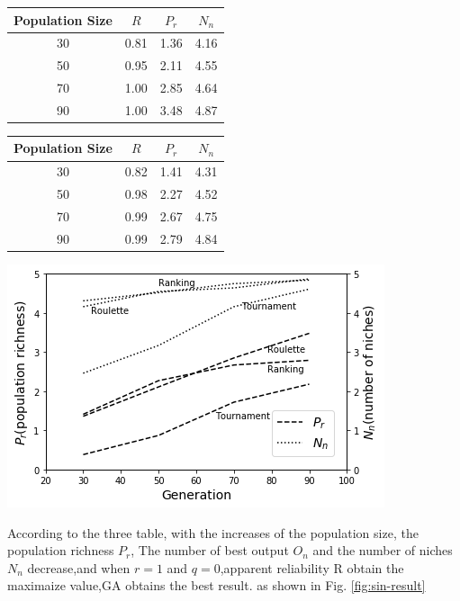 \documentclass[smallextended]{svjour3}       %
\begin{document}
\begin{multicols}{2}
\begin{center}
\begin{tabular}{cccc}
	\toprule
    Population Size& $R$   &  $P_{r}$ & $N_{n}$\\
	\midrule
    30& 0.81  &  1.36   & 4.16 \\
    50& 0.95  &  2.11   & 4.55 \\
    70& 1.00  &  2.85   & 4.64 \\
    90& 1.00  &  3.48   & 4.87 \\
	\bottomrule
\end{tabular}
\label{tab:roulette-1}
\end{center}

\begin{center}
\begin{tabular}{cccc}
	\toprule
    Population Size& $R$   &  $P_{r}$ & $N_{n}$\\
	\midrule
    30& 0.82  &  1.41   & 4.31 \\
    50& 0.98  &  2.27   & 4.52 \\
    70& 0.99  &  2.67   & 4.75 \\
    90& 0.99  &  2.79   & 4.84 \\
	\bottomrule
\end{tabular}
\label{tab:ranking-1}
\end{center}

\begin{center}
  \includegraphics[width=\linewidth]{GA_images/example-case1.png}
  \label{fig:case1result}
\end{center}

According to the three table, with the increases of the population size, the
population richness $P_r$, The number of best output $O_n$ and the number of
niches $N_n$ decrease,and when $r=1$ and $q=0$,apparent reliability R obtain the
maximaize value,GA obtains the best result.  as shown in Fig.
\ref{fig:sin-result} 


\end{multicols}
\end{document}
